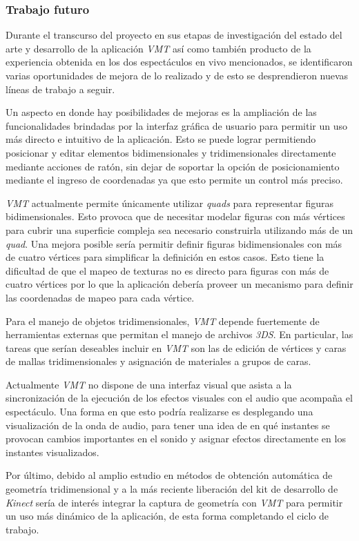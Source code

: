 \subsubsection{Trabajo futuro}

Durante el transcurso del proyecto en sus etapas de investigación del estado del arte y desarrollo de la aplicación \emph{VMT} así como también producto de la experiencia obtenida en los dos espectáculos en vivo mencionados, se identificaron varias oportunidades de mejora de lo realizado y de esto se desprendieron nuevas líneas de trabajo a seguir.

Un aspecto en donde hay posibilidades de mejoras es la ampliación de las funcionalidades brindadas por la interfaz gráfica de usuario para permitir un uso más directo e intuitivo de la aplicación.
Esto se puede lograr permitiendo posicionar y editar elementos bidimensionales y tridimensionales directamente mediante acciones de ratón, sin dejar de soportar la opción de posicionamiento mediante el ingreso de coordenadas ya que esto permite un control más preciso.

\emph{VMT} actualmente permite únicamente utilizar \emph{quads} para representar figuras bidimensionales. Esto provoca que de necesitar modelar figuras con más vértices para cubrir una superficie compleja sea necesario construirla utilizando más de un \emph{quad}. Una mejora posible sería permitir definir figuras bidimensionales con más de cuatro vértices para simplificar la definición en estos casos. Esto tiene la dificultad de que el mapeo de texturas no es directo para figuras con más de cuatro vértices por lo que la aplicación debería proveer un mecanismo para definir las coordenadas de mapeo para cada vértice.

Para el manejo de objetos tridimensionales, \emph{VMT} depende fuertemente de herramientas externas que permitan el manejo de archivos \emph{3DS}. En particular, las tareas que serían deseables incluir en \emph{VMT} son las de edición de vértices y caras de mallas tridimensionales y asignación de materiales a grupos de caras.

Actualmente \emph{VMT} no dispone de una interfaz visual que asista a la sincronización de la ejecución de los efectos visuales con el audio que acompaña el espectáculo.
Una forma en que esto podría realizarse es desplegando una visualización de la onda de audio, para tener una idea de en qué instantes se provocan cambios importantes en el sonido y asignar efectos directamente en los instantes visualizados.

Por último, debido al amplio estudio en métodos de obtención automática de geometría tridimensional y a la más reciente liberación del kit de desarrollo de \emph{Kinect} sería de interés integrar la captura de geometría con \emph{VMT} para permitir un uso más dinámico de la aplicación, de esta forma completando el ciclo de trabajo.
